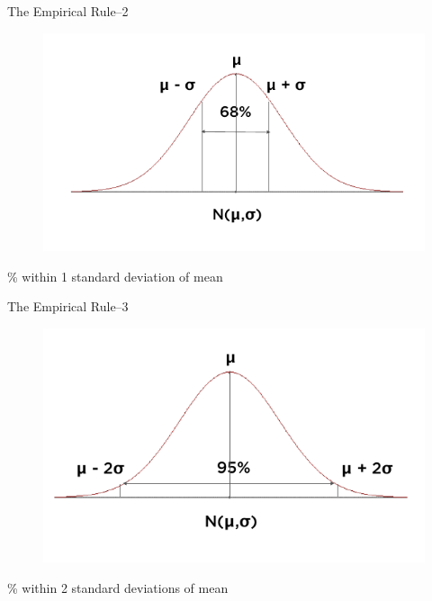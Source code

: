 \documentclass[10pt,dvipsnames, aspectratio=169]{beamer}
\begin{document}
\begin{frame}[t]{The Empirical Rule--2}
	
	\begin{figure} [ht]
		\centering
		\includegraphics[trim={0 1cm 0 0}, clip, scale=0.4]{eda/nd7.png}
	\end{figure}
	
	\% within 1 standard deviation of mean
	
\end{frame}

\begin{frame}[t]{The Empirical Rule--3}
	
	\begin{figure} [ht]
		\centering
		\includegraphics[trim={0 1cm 0 0}, clip, scale=0.4]{eda/nd8.png}
	\end{figure}
	
	\% within 2 standard deviations of mean
	
\end{frame}
\end{document}
